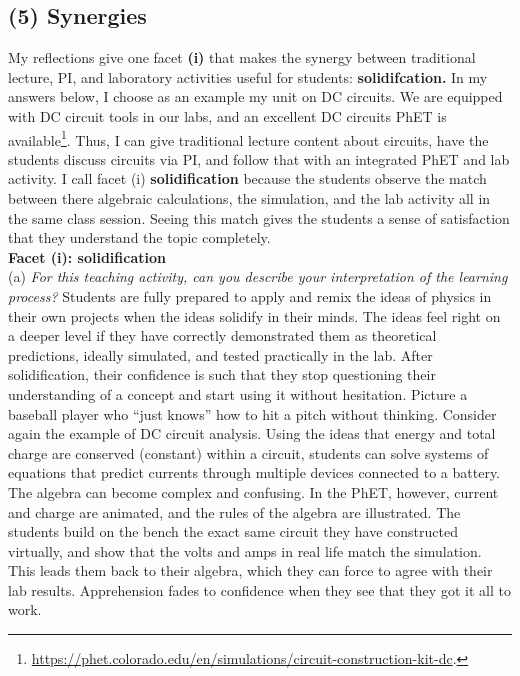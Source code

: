 \documentclass[../../../main.tex]{subfiles}
\begin{document}
\subsection{(5) Synergies}

My reflections give one facet \textbf{(i)} that makes the synergy between traditional lecture, PI, and laboratory activities useful for students: \textbf{solidifcation.}  In my answers below, I choose as an example my unit on DC circuits.  We are equipped with DC circuit tools in our labs, and an excellent DC circuits PhET is available\footnote{\url{https://phet.colorado.edu/en/simulations/circuit-construction-kit-dc}.}.  Thus, I can give traditional lecture content about circuits, have the students discuss circuits via PI, and follow that with an integrated PhET and lab activity.  I call facet (i) \textbf{solidification} because the students observe the match between there algebraic calculations, the simulation, and the lab activity all in the same class session.  Seeing this match gives the students a sense of satisfaction that they understand the topic completely.
\\
\vspace{0.25cm}
\textbf{Facet (i): solidification}
\\
\vspace{0.25cm}
(a) \textit{For this teaching activity, can you describe your interpretation of the learning process?}  Students are fully prepared to apply and remix the ideas of physics in their own projects when the ideas solidify in their minds.  The ideas feel right on a deeper level if they have correctly demonstrated them as theoretical predictions, ideally simulated, and tested practically in the lab.  After solidification, their confidence is such that they stop questioning their understanding of a concept and start using it without hesitation.  Picture a baseball player who ``just knows'' how to hit a pitch without thinking.  Consider again the example of DC circuit analysis.  Using the ideas that energy and total charge are conserved (constant) within a circuit, students can solve systems of equations that predict currents through multiple devices connected to a battery.  The algebra can become complex and confusing.  In the PhET, however, current and charge are animated, and the rules of the algebra are illustrated.  The students build on the bench the exact same circuit they have constructed virtually, and show that the volts and amps in real life match the simulation.  This leads them back to their algebra, which they can force to agree with their lab results.  Apprehension fades to confidence when they see that they got it all to work.
\end{document}
